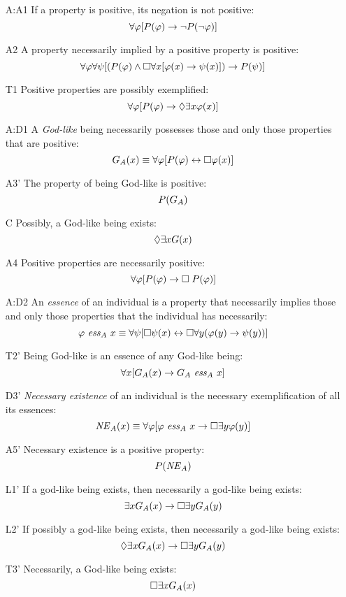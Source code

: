 \documentclass{birkjour}
\theoremstyle{definition}
\theoremstyle{remark}
\numberwithin{equation}{section}
\begin{document}
\begin{appendix}
\begin{itemize}
\item[A:A1] If a property is positive, its negation is not positive:
  $$\forall \varphi [P(\varphi) \rightarrow \neg P(\neg \varphi)]$$ 
\item[A2] A property necessarily implied by a
  positive property is positive:
  $$\forall \varphi \forall \psi [(P(\varphi) \wedge \Box \forall x [\varphi(x)
  \rightarrow \psi(x)]) \rightarrow P(\psi)]$$
\item[T1] Positive properties are possibly exemplified: 
  $$\forall \varphi [P(\varphi) \rightarrow \Diamond \exists x \varphi(x)]$$ 
\item[A:D1] A \emph{God-like} being necessarily possesses those and only those properties that are positive: 
  $$G_A(x) \equiv \forall \varphi [P(\varphi) \leftrightarrow \Box \varphi(x)]$$ 
\item[A3']  The property of being God-like is positive: 
  $$P(G_A)$$
\item[C\phantom{1}] Possibly, a God-like being exists: $$\Diamond \exists x G(x)$$
\item[A4]  Positive properties are necessarily positive: 
  $$\forall \varphi [P(\varphi) \rightarrow \Box \; P(\varphi)]$$ 
\item[A:D2] An \emph{essence} of an individual is a property that necessarily implies those and only those properties that the individual has necessarily: $$\varphi \ \mathit{ess}_A \ x \equiv \forall
  \psi [\Box \psi(x) \leftrightarrow \Box \forall y (\varphi(y) \rightarrow \psi(y))]$$ 
\item[T2']  Being God-like is an essence of any
  God-like being: $$\forall x [G_A(x) \rightarrow G_A \ \mathit{ess}_A \ x]$$
\item[D3'] \emph{Necessary existence} of an individual is the necessary exemplification of all its essences: 
  $$\mathit{NE}_A(x) \equiv \forall \varphi [\varphi \ \mathit{ess}_A \ x \rightarrow \Box
  \exists y \varphi(y)]$$
\item[A5'] Necessary existence is a positive property: $$P(\mathit{NE}_A)$$ 
\item[L1'] If a god-like being exists, then necessarily a god-like being exists: 
  $$\exists x G_A(x) \rightarrow \Box \exists y G_A(y)$$
\item[L2'] If possibly a god-like being exists, then necessarily a god-like being exists: 
  $$\Diamond \exists x G_A(x) \rightarrow \Box \exists y G_A(y) $$
%
\item[T3'] Necessarily, a God-like being exists: $$\Box \exists x G_A(x)$$ 
\end{itemize}



\end{appendix}
\end{document}
